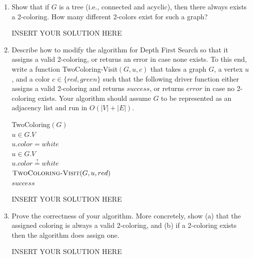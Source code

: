 \begin{enumerate}
    \item 
    Show that if $G$ is a tree (i.e., connected and acyclic), then there always exists a 2-coloring. How many different 2-colors exist for such a graph?

\begin{solution}   INSERT YOUR SOLUTION HERE   \end{solution}


	\item 
	Describe how to modify the algorithm for Depth First Search so that it assigns a valid 2-coloring, or returns an error in case none exists. To this end, write a function {\sc TwoColoring-Visit}$(G,u,c)$ that takes a graph $G$, a vertex $u$, and a color $c \in \{red,green\}$ such that the following driver function either assigns a valid 2-coloring and returns $success$, or returns $error$ in case no 2-coloring exists. Your algorithm should assume $G$ to be represented as an adjacency list and run in $O(|V| + |E|)$. 
	
	\begin{code}
		{\sc TwoColoring}$(G)$\\
		\> \For $u \in G.V$ \Do \\
		\> \> $u.color = white$ \\
		\> \For $u \in G.V$ \Do \\
		\> \> \If $u.color \stackrel{?}{=} white$ \Then \\
		\> \> \> $\text{\sc TwoColoring-Visit}(G,u,red)$ \\
		\> \Return $success$ \\
	\end{code}

\begin{solution}   INSERT YOUR SOLUTION HERE   \end{solution}

    \item Prove the correctness of your algorithm. More concretely, show (a) that the assigned coloring is always a valid 2-coloring, and (b) if a 2-coloring exists then the algorithm does assign one.
    
\begin{solution}   INSERT YOUR SOLUTION HERE   \end{solution}
\end{enumerate}
